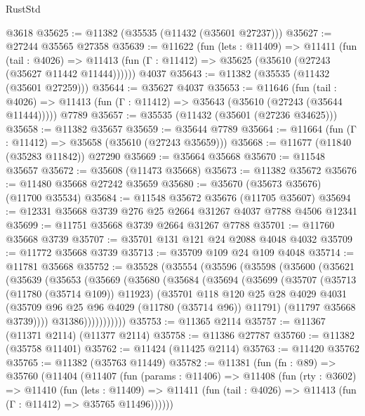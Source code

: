 \begin{lexlean}{RustStd}
\begin{coremodule}
    @3618
@35625 := @11382 (@35535 (@11432 (@35601 @27237)))
@35627 := @27244 @35565 @27358
@35639 := @11622
    (fun (lets : @11409) =>
    @11411
      (fun (tail : @4026) =>
      @11413 (fun (Γ : @11412) => @35625 (@35610 (@27243 (@35627 @11442 @11444))))))
    @4037
@35643 := @11382 (@35535 (@11432 (@35601 @27259)))
@35644 := @35627 @4037
@35653 := @11646
    (fun (tail : @4026) => @11413 (fun (Γ : @11412) => @35643 (@35610 (@27243 (@35644 @11444)))))
    @7789
@35657 := @35535 (@11432 (@35601 (@27236 @34625)))
@35658 := @11382 @35657
@35659 := @35644 @7789
@35664 := @11664 (fun (Γ : @11412) => @35658 (@35610 (@27243 @35659)))
@35668 := @11677 (@11840 (@35283 @11842)) @27290
@35669 := @35664 @35668
@35670 := @11548 @35657
@35672 := @35608 (@11473 @35668)
@35673 := @11382 @35672
@35676 := @11480 @35668 @27242 @35659
@35680 := @35670 (@35673 @35676) (@11700 @35534)
@35684 := @11548 @35672 @35676 (@11705 @35607)
@35694 := @12331 @35668 @3739 @276 @25 @2664 @31267 @4037 @7788 @4506 @12341
@35699 := @11751 @35668 @3739 @2664 @31267 @7788
@35701 := @11760 @35668 @3739
@35707 := @35701 @131 @121 @24 @2088 @4048 @4032
@35709 := @11772 @35668 @3739
@35713 := @35709 @109 @24 @109 @4048
@35714 := @11781 @35668
@35752 := @35528
    (@35554
      (@35596
        (@35598
          (@35600
            (@35621
              (@35639
                (@35653
                  (@35669
                    (@35680
                      (@35684
                        (@35694
                          (@35699
                            (@35707
                              (@35713 (@11780 (@35714 @109)) @11923)
                              (@35701
                                @118
                                @120
                                @25
                                @28
                                @4029
                                @4031
                                (@35709 @96 @25 @96 @4029 (@11780 (@35714 @96)) @11791)
                                (@11797 @35668 @3739))))
                          @31386)))))))))))
@35753 := @11365 @2114
@35757 := @11367 (@11371 @2114) (@11377 @2114)
@35758 := @11386 @27787
@35760 := @11382 (@35758 @11401)
@35762 := @11424 (@11425 @2114)
@35763 := @11420 @35762
@35765 := @11382 (@35763 @11449)
@35782 := @11381
    (fun (fn : @89) =>
    @35760
      (@11404
        (@11407
          (fun (params : @11406) =>
          @11408
            (fun (rty : @3602) =>
            @11410
              (fun (lets : @11409) =>
              @11411 (fun (tail : @4026) => @11413 (fun (Γ : @11412) => @35765 @11496))))))

\end{coremodule}
\end{lexlean}
